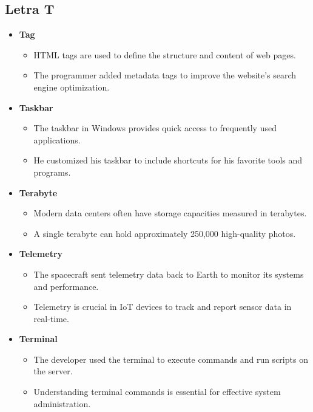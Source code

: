     \subsection{Letra T}
    \begin{itemize}
        \item \textbf{Tag}
        \begin{itemize}
            \item HTML tags are used to define the structure and content of web pages.
            \item The programmer added metadata tags to improve the website's search engine optimization.
        \end{itemize}
        \item \textbf{Taskbar}
        \begin{itemize}
            \item The taskbar in Windows provides quick access to frequently used applications.
            \item He customized his taskbar to include shortcuts for his favorite tools and programs.
        \end{itemize}
        \item \textbf{Terabyte}
        \begin{itemize}
            \item Modern data centers often have storage capacities measured in terabytes.
            \item A single terabyte can hold approximately 250,000 high-quality photos.
        \end{itemize}
        \item \textbf{Telemetry}
        \begin{itemize}
            \item The spacecraft sent telemetry data back to Earth to monitor its systems and performance.
            \item Telemetry is crucial in IoT devices to track and report sensor data in real-time.
        \end{itemize}
        \item \textbf{Terminal}
        \begin{itemize}
            \item The developer used the terminal to execute commands and run scripts on the server.
            \item Understanding terminal commands is essential for effective system administration.

\end{itemize}
\end{itemize}
